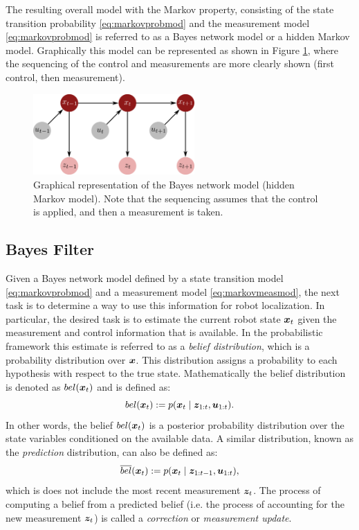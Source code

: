 The resulting overall model with the Markov property, consisting of the state transition probability \eqref{eq:markovprobmod} and the measurement model \eqref{eq:markovprobmod} is referred to as a Bayes network model or a hidden Markov model. Graphically this model can be represented as shown in Figure \ref{fig:hmm}, where the sequencing of the control and measurements are more clearly shown (first control, then measurement).
\begin{figure}[ht]
	\centering
    \includegraphics[width=0.55\textwidth]{tex/figs/ch14_figs/hmm.png}
    \caption{Graphical representation of the Bayes network model (hidden Markov model). Note that the sequencing assumes that the control is applied, and then a measurement is taken.}
    \label{fig:hmm}
\end{figure}


\subsection{Bayes Filter}
Given a Bayes network model defined by a state transition model \eqref{eq:markovprobmod} and a measurement model \eqref{eq:markovmeasmod}, the next task is to determine a way to use this information for robot localization. In particular, the desired task is to estimate the current robot state $\bm{x}_t$ given the measurement and control information that is available. In the probabilistic framework this estimate is referred to as a \textit{belief distribution}, which is a probability distribution over $\bm{x}$. This distribution assigns a probability to each hypothesis with respect to the true state. Mathematically the belief distribution is denoted as $bel(\bm{x}_t)$ and is defined as:
\begin{equation} \label{eq:belief}
bel(\bm{x}_t):=p(\bm{x}_t\mid \bm{z}_{1:t}, \bm{u}_{1:t}).
\end{equation}
In other words, the belief $bel(\bm{x}_t)$ is a posterior probability distribution over the state variables conditioned on the available data. A similar distribution, known as the \textit{prediction} distribution, can also be defined as:
\begin{equation} \label{eq:predbelief}
\overline{bel}(\bm{x}_t):=p(\bm{x}_t\mid \bm{z}_{1:t-1},\bm{u}_{1:t}),
\end{equation}
which is does not include the most recent measurement $\bm{z}_t$. The process of computing a belief from a predicted belief (i.e. the process of accounting for the new measurement $\bm{z}_t$) is called a \textit{correction} or \textit{measurement update}.

